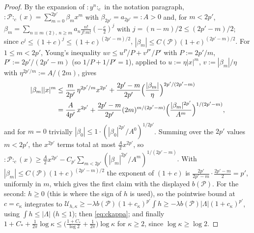 \documentclass[11pt,a4paper]{article}
\theoremstyle{plain}
\theoremstyle{definition}
\theoremstyle{plain}
\theoremstyle{definition}
\begin{document}
\begin{proof}
By the expansion of ${:}y^n{:}_c$ in the notation paragraph,
${:}\mathscr P{:}_c(x)=\sum_{m=0}^{2p'}\beta_mx^m$ with $\beta_{2p'}=a_{2p'}=:A>0$ and, for
$m<2p'$, $\beta_m=\sum_{n\equiv m\ (2),\ n\ge m}a_n\frac{n!}{j!\,m!}(-\frac c2)^j$ with
$j=(n-m)/2\le(2p'-m)/2$; since $c^j\le(1+c)^j\le(1+c)^{(2p'-m)/2}$,
$|\beta_m|\le C(\mathscr P)(1+c)^{(2p'-m)/2}$.  For $1\le m<2p'$, Young's inequality
$uv\le u^P/P+v^{P'}/P'$ with $P:=2p'/m$, $P':=2p'/(2p'-m)$ (so $1/P+1/P'=1$), applied to
$u:=\eta|x|^m$, $v:=|\beta_m|/\eta$ with $\eta^{2p'/m}:=A/(2m)$, gives
\begin{align*}
  |\beta_m||x|^m&\le\frac{m}{2p'}\,\eta^{2p'/m}x^{2p'}+\frac{2p'-m}{2p'}\Bigl(\frac{|\beta_m|}
  {\eta}\Bigr)^{2p'/(2p'-m)}\\
  &=\frac{A}{4p'}\,x^{2p'}+\frac{2p'-m}{2p'}(2m)^{m/(2p'-m)}\Bigl(\frac{|\beta_m|^{2p'}}{A^{m}}
  \Bigr)^{1/(2p'-m)},
\end{align*}
and for $m=0$ trivially $|\beta_0|\le1\cdot(|\beta_0|^{2p'}/A^0)^{1/2p'}$.  Summing over the
$2p'$ values $m<2p'$, the $x^{2p'}$ terms total at most $\frac{A}{2}x^{2p'}$, so
${:}\mathscr P{:}_c(x)\ge\frac A2x^{2p'}-C_{p'}\sum_{m<2p'}(|\beta_m|^{2p'}/A^m)^{1/(2p'-m)}$.
With $|\beta_m|\le C(\mathscr P)(1+c)^{(2p'-m)/2}$ the exponent of $(1+c)$ is
$\frac{2p'}{2p'-m}\cdot\frac{2p'-m}{2}=p'$, uniformly in $m$, which gives the first claim
with the displayed $b(\mathscr P)$.  For the second: $h\ge0$ (this is where the sign of $h$
is used), so the pointwise bound at $c=c_\kappa$ integrates to $\mathcal U_{h,\kappa}\ge
-\lambda b(\mathscr P)(1+c_\kappa)^{p'}\int h\ge-\lambda b(\mathscr P)|\Lambda|(1+c_\kappa)^{p'}$,
using $\int h\le|\Lambda|$ ($h\le1$); then \eqref{eq:ckappa}; and finally
$1+C_*+\frac1{2\pi}\log\kappa\le\bigl(\frac{1+C_*}{\log2}+\frac1{2\pi}\bigr)\log\kappa$ for
$\kappa\ge2$, since $\log\kappa\ge\log2$.
\end{proof}
\end{document}
